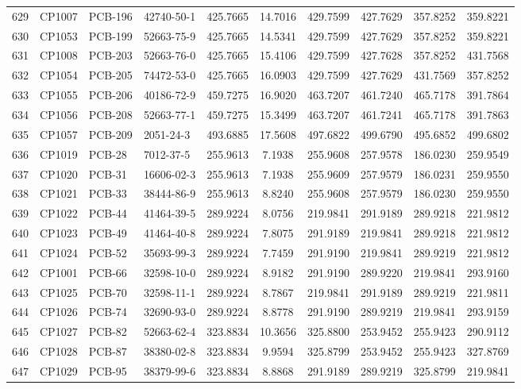 \begin{longtable}{clllcccccc}
629 & CP1007 & PCB-196 & 42740-50-1 & 425.7665 & 14.7016 & 429.7599 & 427.7629 & 357.8252 & 359.8221 \\ 
630 & CP1053 & PCB-199 & 52663-75-9 & 425.7665 & 14.5341 & 429.7599 & 427.7629 & 357.8252 & 359.8221 \\ 
631 & CP1008 & PCB-203 & 52663-76-0 & 425.7665 & 15.4106 & 429.7599 & 427.7628 & 357.8252 & 431.7568 \\ 
632 & CP1054 & PCB-205 & 74472-53-0 & 425.7665 & 16.0903 & 429.7599 & 427.7629 & 431.7569 & 357.8252 \\ 
633 & CP1055 & PCB-206 & 40186-72-9 & 459.7275 & 16.9020 & 463.7207 & 461.7240 & 465.7178 & 391.7864 \\ 
634 & CP1056 & PCB-208 & 52663-77-1 & 459.7275 & 15.3499 & 463.7207 & 461.7241 & 465.7178 & 391.7863 \\ 
635 & CP1057 & PCB-209 & 2051-24-3 & 493.6885 & 17.5608 & 497.6822 & 499.6790 & 495.6852 & 499.6802 \\ 
636 & CP1019 & PCB-28 & 7012-37-5 & 255.9613 & 7.1938 & 255.9608 & 257.9578 & 186.0230 & 259.9549 \\ 
637 & CP1020 & PCB-31 & 16606-02-3 & 255.9613 & 7.1938 & 255.9609 & 257.9579 & 186.0231 & 259.9550 \\ 
638 & CP1021 & PCB-33 & 38444-86-9 & 255.9613 & 8.8240 & 255.9608 & 257.9579 & 186.0230 & 259.9550 \\ 
639 & CP1022 & PCB-44 & 41464-39-5 & 289.9224 & 8.0756 & 219.9841 & 291.9189 & 289.9218 & 221.9812 \\ 
640 & CP1023 & PCB-49 & 41464-40-8 & 289.9224 & 7.8075 & 291.9189 & 219.9841 & 289.9218 & 221.9812 \\ 
641 & CP1024 & PCB-52 & 35693-99-3 & 289.9224 & 7.7459 & 291.9190 & 219.9841 & 289.9219 & 221.9812 \\ 
642 & CP1001 & PCB-66 & 32598-10-0 & 289.9224 & 8.9182 & 291.9190 & 289.9220 & 219.9841 & 293.9160 \\ 
643 & CP1025 & PCB-70 & 32598-11-1 & 289.9224 & 8.7867 & 219.9841 & 291.9189 & 289.9219 & 221.9811 \\ 
644 & CP1026 & PCB-74 & 32690-93-0 & 289.9224 & 8.8778 & 291.9190 & 289.9219 & 219.9841 & 293.9159 \\ 
645 & CP1027 & PCB-82 & 52663-62-4 & 323.8834 & 10.3656 & 325.8800 & 253.9452 & 255.9423 & 290.9112 \\ 
646 & CP1028 & PCB-87 & 38380-02-8 & 323.8834 & 9.9594 & 325.8799 & 253.9452 & 255.9423 & 327.8769 \\ 
647 & CP1029 & PCB-95 & 38379-99-6 & 323.8834 & 8.8868 & 291.9189 & 289.9219 & 325.8799 & 219.9841 \\ 

\end{longtable}
